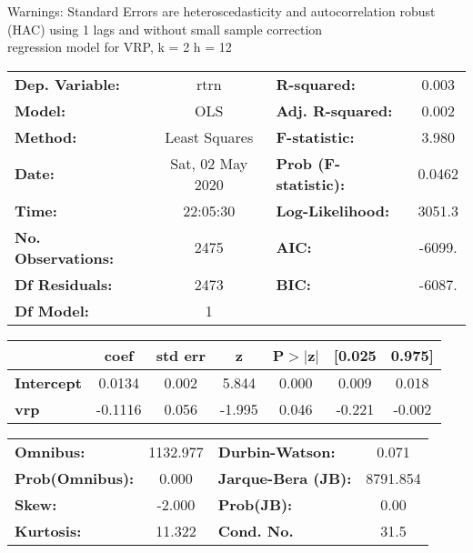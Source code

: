 Warnings: \newline
 [1] Standard Errors are heteroscedasticity and autocorrelation robust (HAC) using 1 lags and without small sample correction\\ 

regression model for VRP, k = 2 h = 12\begin{center}
\begin{tabular}{lclc}
\toprule
\textbf{Dep. Variable:}    &       rtrn       & \textbf{  R-squared:         } &     0.003   \\
\textbf{Model:}            &       OLS        & \textbf{  Adj. R-squared:    } &     0.002   \\
\textbf{Method:}           &  Least Squares   & \textbf{  F-statistic:       } &     3.980   \\
\textbf{Date:}             & Sat, 02 May 2020 & \textbf{  Prob (F-statistic):} &   0.0462    \\
\textbf{Time:}             &     22:05:30     & \textbf{  Log-Likelihood:    } &    3051.3   \\
\textbf{No. Observations:} &        2475      & \textbf{  AIC:               } &    -6099.   \\
\textbf{Df Residuals:}     &        2473      & \textbf{  BIC:               } &    -6087.   \\
\textbf{Df Model:}         &           1      & \textbf{                     } &             \\
\bottomrule
\end{tabular}
\begin{tabular}{lcccccc}
                   & \textbf{coef} & \textbf{std err} & \textbf{z} & \textbf{P$> |$z$|$} & \textbf{[0.025} & \textbf{0.975]}  \\
\midrule
\textbf{Intercept} &       0.0134  &        0.002     &     5.844  &         0.000        &        0.009    &        0.018     \\
\textbf{vrp}       &      -0.1116  &        0.056     &    -1.995  &         0.046        &       -0.221    &       -0.002     \\
\bottomrule
\end{tabular}
\begin{tabular}{lclc}
\textbf{Omnibus:}       & 1132.977 & \textbf{  Durbin-Watson:     } &    0.071  \\
\textbf{Prob(Omnibus):} &   0.000  & \textbf{  Jarque-Bera (JB):  } & 8791.854  \\
\textbf{Skew:}          &  -2.000  & \textbf{  Prob(JB):          } &     0.00  \\
\textbf{Kurtosis:}      &  11.322  & \textbf{  Cond. No.          } &     31.5  \\
\bottomrule
\end{tabular}
\end{center}

